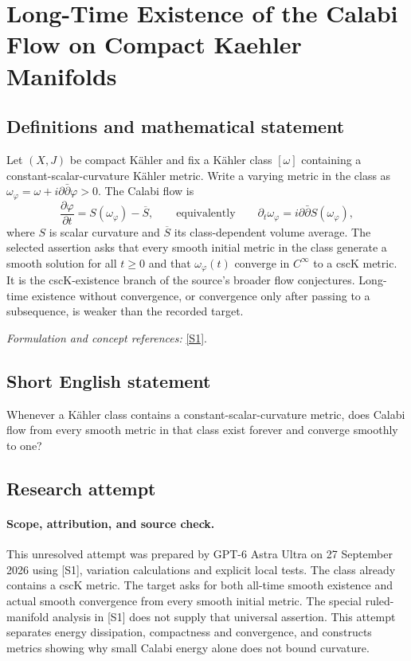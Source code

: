 \documentclass[11pt]{article}
\begin{document}
\section*{\texorpdfstring{Long-Time Existence of the Calabi Flow on Compact Kaehler Manifolds}{Long-Time Existence of the Calabi Flow on Compact Kaehler Manifolds}}\label{401}
\subsection{Definitions and mathematical statement}
Let $(X,J)$ be compact K\"ahler and fix a K\"ahler class $[\omega]$ containing a constant-scalar-curvature K\"ahler metric. Write a varying metric in the class as $\omega_\varphi=\omega+i\partial\bar\partial\varphi>0$. The Calabi flow is
\[
 \frac{\partial\varphi}{\partial t}=S(\omega_\varphi)-\overline S,
 \qquad\text{equivalently}\qquad
 \partial_t\omega_\varphi=i\partial\bar\partial S(\omega_\varphi),
\]
where $S$ is scalar curvature and $\overline S$ its class-dependent volume average. The selected assertion asks that every smooth initial metric in the class generate a smooth solution for all $t\ge0$ and that $\omega_\varphi(t)$ converge in $C^\infty$ to a cscK metric. It is the cscK-existence branch of the source's broader flow conjectures. Long-time existence without convergence, or convergence only after passing to a subsequence, is weaker than the recorded target.
\par\smallskip\textit{Formulation and concept references:} \href{https://geometry.ulb.ac.be/wp-content/uploads/2022/04/Calabi-Flow-Version-VII.pdf}{[S1]}.

\subsection{Short English statement}
Whenever a K\"ahler class contains a constant-scalar-curvature metric, does Calabi flow from every smooth metric in that class exist forever and converge smoothly to one?
\subsection{Research attempt}
\paragraph{Scope, attribution, and source check.}
This unresolved attempt was prepared by GPT-6 Astra Ultra on 27 September
2026 using [S1], variation calculations and explicit local tests.
The class already contains a cscK metric. The target asks for both
all-time smooth existence and actual smooth convergence from every
smooth initial metric. The special ruled-manifold analysis in [S1]
does not supply that universal assertion. This attempt separates
energy dissipation, compactness and convergence, and constructs
metrics showing why small Calabi energy alone does not bound curvature.
\end{document}
